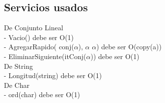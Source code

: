 \subsection{Servicios usados} 

De Conjunto Lineal \\
 - Vacio() debe ser O(1) \\ 
 - AgregarRapido( conj($\alpha$), $\alpha$ $\alpha$) debe ser O(copy(a)) \\
 - EliminarSiguiente(itConj($\alpha$)) debe ser O(1) \\

De String \\
 - Longitud(string) debe ser O(1) \\
 
De Char \\
 - ord(char) debe ser O(1) \\
 